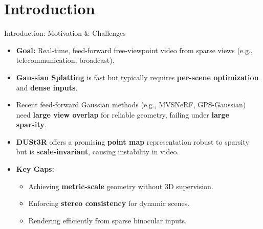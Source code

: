 \section{Introduction}
\begin{frame}{Introduction: Motivation \& Challenges}
    \begin{itemize}
        \item \textbf{Goal:} Real-time, feed-forward free-viewpoint video from sparse views (e.g., telecommunication, broadcast).
        \item \textbf{Gaussian Splatting} is fast but typically requires \textbf{per-scene optimization} and \textbf{dense inputs}.
        \item Recent feed-forward Gaussian methods (e.g., MVSNeRF, GPS-Gaussian) need \textbf{large view overlap} for reliable geometry, failing under \textbf{large sparsity}.
        \item \textbf{DUSt3R} offers a promising \textbf{point map} representation robust to sparsity but is \textbf{scale-invariant}, causing instability in video.
        \item \textbf{Key Gaps:}
        \begin{itemize}
            \item Achieving \textbf{metric-scale} geometry without 3D supervision.
            \item Enforcing \textbf{stereo consistency} for dynamic scenes.
            \item Rendering efficiently from sparse binocular inputs.
        \end{itemize}
    \end{itemize}
\end{frame}

